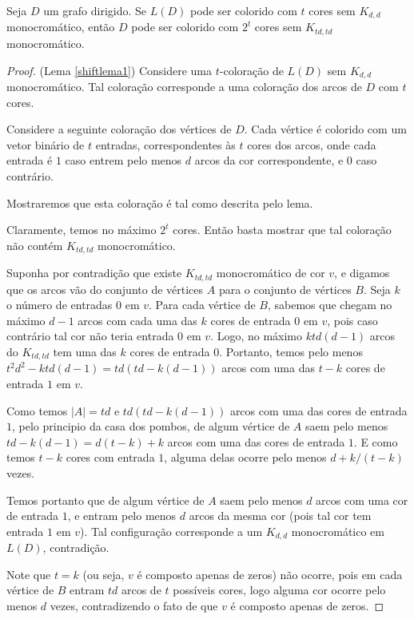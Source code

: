 \begin{lema}\label{shiftlema1}
Seja $D$ um grafo dirigido. Se $L(D)$ pode ser colorido com $t$ cores sem $K_{d,d}$ monocromático, então $D$ pode ser colorido com $2^t$ cores sem $K_{td,td}$ monocromático.
\end{lema}

\begin{proof}{(Lema \ref{shiftlema1})}
Considere uma $t$-coloração de $L(D)$ sem $K_{d,d}$ monocromático. Tal coloração corresponde a uma coloração dos arcos de $D$ com $t$ cores.

Considere a seguinte coloração dos vértices de $D$. Cada vértice é colorido com um vetor binário de $t$ entradas, correspondentes às $t$ cores dos arcos, onde cada entrada é $1$ caso entrem pelo menos $d$ arcos da cor correspondente, e $0$ caso contrário.

Mostraremos que esta coloração é tal como descrita pelo lema. 

Claramente, temos no máximo $2^t$ cores. Então basta mostrar que tal coloração não contém $K_{td,td}$ monocromático.

Suponha por contradição que existe $K_{td,td}$ monocromático de cor $v$, e digamos que os arcos vão do conjunto de vértices $A$ para o conjunto de vértices $B$. Seja $k$ o número de entradas $0$ em $v$. Para cada vértice de $B$, sabemos que chegam no máximo $d-1$ arcos com cada uma das $k$ cores de entrada $0$ em $v$, pois caso contrário tal cor não teria entrada $0$ em $v$. Logo, no máximo $ktd(d-1)$ arcos do $K_{td,td}$ tem uma das $k$ cores de entrada $0$. Portanto, temos pelo menos $t^2d^2 - ktd(d-1) = td(td - k(d-1))$ arcos com uma das $t-k$ cores de entrada $1$ em $v$.

Como temos $|A| = td$ e $td(td - k(d-1))$ arcos com uma das cores de entrada $1$, pelo principio da casa dos pombos, de algum vértice de $A$ saem pelo menos $td - k(d-1) = d(t-k) + k$ arcos com uma das cores de entrada $1$. E como temos $t-k$ cores com entrada $1$, alguma delas ocorre pelo menos $d + k/(t-k)$ vezes. 

Temos portanto que de algum vértice de $A$ saem pelo menos $d$ arcos com uma cor de entrada $1$, e entram pelo menos $d$ arcos da mesma cor (pois tal cor tem entrada $1$ em $v$). Tal configuração corresponde a um $K_{d,d}$ monocromático em $L(D)$, contradição.

Note que $t=k$ (ou seja, $v$ é composto apenas de zeros) não ocorre, pois em cada vértice de $B$ entram $td$ arcos de $t$ possíveis cores, logo alguma cor ocorre pelo menos $d$ vezes, contradizendo o fato de que $v$ é composto apenas de zeros.
\end{proof}

